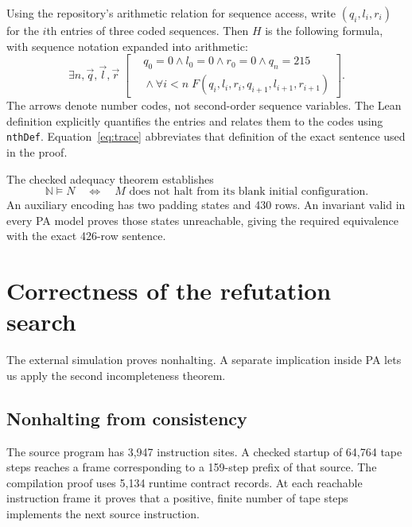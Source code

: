 \documentclass[11pt,letterpaper]{article}
\newcommand{\NN}{\mathbb{N}}
\begin{document}
Using the repository's arithmetic relation for sequence access, write
$(q_i,l_i,r_i)$ for the $i$th entries of three coded sequences. Then $H$
is the following formula, with sequence notation expanded into arithmetic:
\begin{equation}\label{eq:trace}
\exists n,\vec q,\vec l,\vec r\;
\left[
\begin{aligned}
&q_0=0\land l_0=0\land r_0=0\land q_n=215\ \\
&{}\land\forall i<n\;F(q_i,l_i,r_i,q_{i+1},l_{i+1},r_{i+1})
\end{aligned}\right].
\end{equation}
The arrows denote number codes, not second-order sequence variables.
The Lean definition explicitly quantifies the entries and relates them to
the codes using \texttt{nthDef}. Equation~\eqref{eq:trace} abbreviates that
definition of the exact sentence used in the proof.

The checked adequacy theorem establishes
\begin{equation}\label{eq:adequacy}
\NN\models N\quad\Longleftrightarrow\quad
M\text{ does not halt from its blank initial configuration}.
\end{equation}
An auxiliary encoding has two padding states and 430 rows. An invariant
valid in every PA model proves those states unreachable, giving the
required equivalence with the exact 426-row sentence.

\section{Correctness of the refutation search}\label{sec:bridge}

The external simulation proves nonhalting. A separate implication inside
PA lets us apply the second incompleteness theorem.

\subsection{Nonhalting from consistency}

The source program has 3,947 instruction sites. A checked startup of
64,764 tape steps reaches a frame corresponding to a 159-step prefix of
that source. The compilation proof uses 5,134 runtime contract records.
At each reachable instruction frame it proves that a positive, finite
number of tape steps implements the next source instruction.
\end{document}
